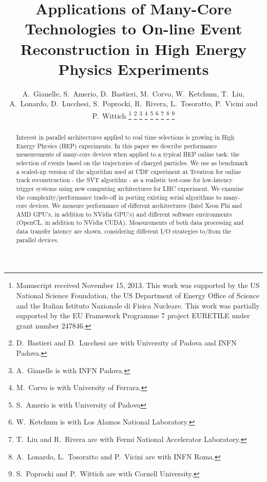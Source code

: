 \documentclass[journal]{IEEEtran}
\begin{document}
\title{Applications of Many-Core Technologies to On-line Event Reconstruction in High Energy Physics
Experiments}
\author{A.~Gianelle, 
  S.~Amerio, 
  D.~Bastieri, 
  M.~Corvo, 
  W.~Ketchum,
  T.~Liu, 
  A.~Lonardo, 
  D.~Lucchesi,
  S.~Poprocki, 
  R.~Rivera, 
  L.~Tosoratto,
  P.~Vicini
  and 
  P.~Wittich
\thanks{Manuscript received November 15, 2013.
This work was supported by the  US National Science Foundation, the US 
Department of Energy Office of Science and the Italian
Istituto Nazionale di Fisica Nucleare. This work was partially supported by the 
EU Framework Programme 7 project EURETILE under grant number 247846.}%
\thanks{D.~Bastieri and D.~Lucchesi are with University of Padova and INFN Padova.}%
\thanks{A.~Gianelle is with INFN Padova.}%
\thanks{M.~Corvo is with University of Ferrara.}%
\thanks{S.~Amerio is with University of Padova}%
\thanks{W.~Ketchum is with Los Alamos National Laboratory.}%
\thanks{T.~Liu and R.~Rivera are with Fermi National Accelerator Laboratory.}%
\thanks{A.~Lonardo, L.~Tosoratto and P.~Vicini are with INFN Roma.}%
\thanks{S.~Poprocki and P.~Wittich are with Cornell University.}
}
\maketitle
\thispagestyle{empty}
\begin{abstract}
  Interest in parallel architectures applied to real time selections is 
  growing in High Energy Physics (HEP) experiments. In this paper we describe
  performance measurements of many-core devices 
  when applied to a typical HEP online task: 
  the selection of events based on the trajectories of charged particles.
  We use as benchmark a scaled-up version of the algorithm used at CDF 
  experiment at Tevatron for online track reconstruction - the SVT algorithm - 
  as a realistic  test-case for low-latency trigger systems using new computing
  architectures for LHC experiment. We examine the
  complexity/performance trade-off in porting existing serial
  algorithms to many-core devices. We measure performance of
different architectures (Intel Xeon Phi and AMD GPU's, in addition 
to NVidia GPU's) and different software
environments (OpenCL, in addition to NVidia CUDA).
Measurements of both data processing  and data transfer latency are shown, 
considering different I/O strategies 
  to/from the parallel devices. \end{abstract}
\end{document}
